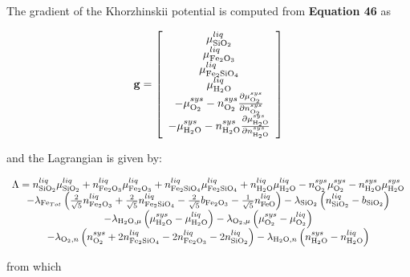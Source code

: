 \documentclass[11pt, titlepage, twoside]{article}
\begin{document}
The gradient of the Khorzhinskii potential is computed from \textbf{Equation 46} as


\begin{MPEquation}[!ht]
\begin{equation}
{\bf{g}} = \left[ {\begin{array}{*{20}{c}}
{\mu _{{\rm{Si}}{{\rm{O}}_2}}^{liq}}\\
{\mu _{{\rm{F}}{{\rm{e}}_2}{{\rm{O}}_3}}^{liq}}\\
{\mu _{{\rm{F}}{{\rm{e}}_{\rm{2}}}{\rm{Si}}{{\rm{O}}_4}}^{liq}}\\
{\mu _{{{\rm{H}}_2}{\rm{O}}}^{liq}}\\
{ - \mu _{{{\rm{O}}_2}}^{sys} - n_{{{\rm{O}}_2}}^{sys}\frac{{\partial \mu _{{{\rm{O}}_2}}^{sys}}}{{\partial n_{{{\rm{O}}_2}}^{sys}}}}\\
{ - \mu _{{{\rm{H}}_2}{\rm{O}}}^{sys} - n_{{{\rm{H}}_2}{\rm{O}}}^{sys}\frac{{\partial \mu _{{{\rm{H}}_2}{\rm{O}}}^{sys}}}{{\partial n_{{{\rm{H}}_2}{\rm{O}}}^{sys}}}}
\end{array}} \right]
\end{equation}
\label{MPEquationElement:3C91031F-9803-430E-A52C-FE86632AE386}
\end{MPEquation}
and the Lagrangian is given by:


\begin{MPEquation}[!ht]
\begin{equation}
\begin{array}{c}
\Lambda  = n_{{\rm{Si}}{{\rm{O}}_2}}^{liq}\mu _{{\rm{Si}}{{\rm{O}}_2}}^{liq} + n_{{\rm{F}}{{\rm{e}}_2}{{\rm{O}}_3}}^{liq}\mu _{{\rm{F}}{{\rm{e}}_2}{{\rm{O}}_3}}^{liq} + n_{{\rm{F}}{{\rm{e}}_{\rm{2}}}{\rm{Si}}{{\rm{O}}_4}}^{liq}\mu _{{\rm{F}}{{\rm{e}}_{\rm{2}}}{\rm{Si}}{{\rm{O}}_4}}^{liq} + n_{{{\rm{H}}_2}{\rm{O}}}^{liq}\mu _{{{\rm{H}}_2}{\rm{O}}}^{liq} - n_{{{\rm{O}}_2}}^{sys}\mu _{{{\rm{O}}_2}}^{sys} - n_{{{\rm{H}}_2}{\rm{O}}}^{sys}\mu _{{{\rm{H}}_2}{\rm{O}}}^{sys}\\
 - {\lambda _{{\rm{F}}{{\rm{e}}_{Tot}}}}\left( {\frac{2}{{\sqrt 5 }}n_{{\rm{F}}{{\rm{e}}_2}{{\rm{O}}_3}}^{liq} + \frac{2}{{\sqrt 5 }}n_{{\rm{F}}{{\rm{e}}_2}{\rm{Si}}{{\rm{O}}_4}}^{liq} - \frac{2}{{\sqrt 5 }}{b_{{\rm{F}}{{\rm{e}}_2}{{\rm{O}}_3}}} - \frac{1}{{\sqrt 5 }}n_{{\rm{FeO}}}^{liq}} \right) - {\lambda _{{\rm{Si}}{{\rm{O}}_2}}}\left( {n_{{\rm{Si}}{{\rm{O}}_2}}^{liq} - {b_{{\rm{Si}}{{\rm{O}}_2}}}} \right)\\
 - {\lambda _{{{\rm{H}}_{\rm{2}}}{\rm{O,}}\mu }}\left( {\mu _{{{\rm{H}}_{\rm{2}}}{\rm{O}}}^{sys} - \mu _{{{\rm{H}}_{\rm{2}}}{\rm{O}}}^{liq}} \right) - {\lambda _{{{\rm{O}}_2},\mu }}\left( {\mu _{{{\rm{O}}_2}}^{sys} - \mu _{{{\rm{O}}_2}}^{liq}} \right)\\
 - {\lambda _{{{\rm{O}}_2},n}}\left( {n_{{{\rm{O}}_2}}^{sys} + 2n_{{\rm{F}}{{\rm{e}}_{\rm{2}}}{\rm{Si}}{{\rm{O}}_4}}^{liq} - 2n_{{\rm{F}}{{\rm{e}}_2}{{\rm{O}}_3}}^{liq} - 2n_{{\rm{Si}}{{\rm{O}}_2}}^{liq}} \right)  - {\lambda _{{{\rm{H}}_{\rm{2}}}{\rm{O,}}n}}\left( {n_{{{\rm{H}}_2}{\rm{O}}}^{sys} - n_{{{\rm{H}}_2}{\rm{O}}}^{liq}} \right)
\end{array}
\end{equation}
\label{MPEquationElement:5BB3D1EE-BCF0-4933-D73D-A4AD452EFF8D}
\end{MPEquation}
from which
\end{document}
